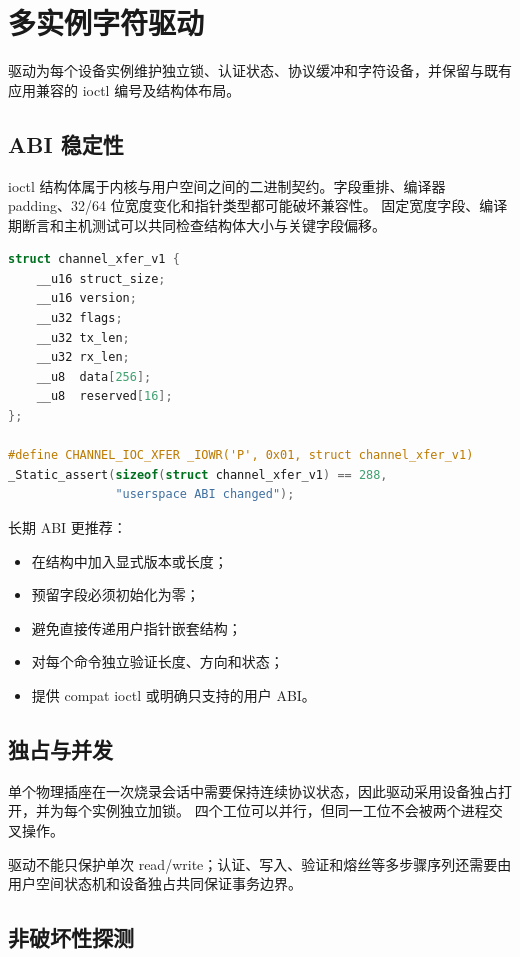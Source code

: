\section{多实例字符驱动}

驱动为每个设备实例维护独立锁、认证状态、协议缓冲和字符设备，并保留与既有应用兼容的 ioctl 编号及结构体布局。

\subsection{ABI 稳定性}

ioctl 结构体属于内核与用户空间之间的二进制契约。字段重排、编译器 padding、32/64 位宽度变化和指针类型都可能破坏兼容性。
固定宽度字段、编译期断言和主机测试可以共同检查结构体大小与关键字段偏移。

\begin{lstlisting}[language=C,caption={可演进 ioctl ABI 的固定布局}]
struct channel_xfer_v1 {
    __u16 struct_size;
    __u16 version;
    __u32 flags;
    __u32 tx_len;
    __u32 rx_len;
    __u8  data[256];
    __u8  reserved[16];
};

#define CHANNEL_IOC_XFER _IOWR('P', 0x01, struct channel_xfer_v1)
_Static_assert(sizeof(struct channel_xfer_v1) == 288,
               "userspace ABI changed");
\end{lstlisting}

长期 ABI 更推荐：
\begin{itemize}
  \item 在结构中加入显式版本或长度；
  \item 预留字段必须初始化为零；
  \item 避免直接传递用户指针嵌套结构；
  \item 对每个命令独立验证长度、方向和状态；
  \item 提供 compat ioctl 或明确只支持的用户 ABI。
\end{itemize}

\subsection{独占与并发}

单个物理插座在一次烧录会话中需要保持连续协议状态，因此驱动采用设备独占打开，并为每个实例独立加锁。
四个工位可以并行，但同一工位不会被两个进程交叉操作。

驱动不能只保护单次 read/write；认证、写入、验证和熔丝等多步骤序列还需要由用户空间状态机和设备独占共同保证事务边界。

\subsection{非破坏性探测}

